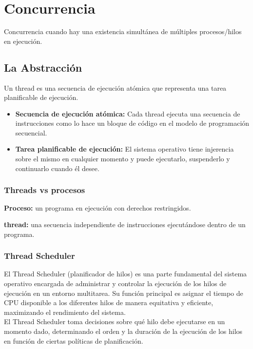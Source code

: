 \documentclass[../main.tex]{subfiles}
\begin{document}
\section{Concurrencia}
    Concurrencia cuando hay una existencia simultánea de múltiples procesos/hilos en ejecución.

    \subsection{La Abstracción}
        Un thread es una secuencia de ejecución atómica que representa una tarea planificable de ejecución.
        \begin{itemize}
            \item \textbf{Secuencia de ejecución atómica:} Cada thread ejecuta una secuencia de instrucciones como lo hace un bloque de código en el modelo de programación secuencial.
            \item \textbf{Tarea planificable de ejecución:} El sistema operativo tiene injerencia sobre el mismo en cualquier momento y puede ejecutarlo, suspenderlo y continuarlo cuando él desee.
        \end{itemize}

        \subsubsection*{Threads vs procesos}
            \textbf{Proceso:} un programa en ejecución con derechos restringidos.

            \textbf{thread:} una secuencia independiente de instrucciones ejecutándose dentro de un programa.

        \subsubsection*{Thread Scheduler}
            El Thread Scheduler (planificador de hilos) es una parte fundamental del sistema operativo encargada de administrar y controlar la ejecución de los hilos de ejecución en un entorno multitarea. Su función principal es asignar el tiempo de CPU disponible a los diferentes hilos de manera equitativa y eficiente, maximizando el rendimiento del sistema.\\

            El Thread Scheduler toma decisiones sobre qué hilo debe ejecutarse en un momento dado, determinando el orden y la duración de la ejecución de los hilos en función de ciertas políticas de planificación. 
\end{document}

